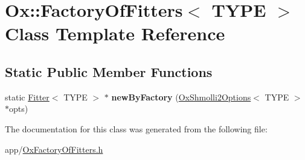 \hypertarget{class_ox_1_1_factory_of_fitters}{\section{Ox\-:\-:Factory\-Of\-Fitters$<$ T\-Y\-P\-E $>$ Class Template Reference}
\label{class_ox_1_1_factory_of_fitters}
}
\subsection*{Static Public Member Functions}
\begin{DoxyCompactItemize}
\item 
\hypertarget{class_ox_1_1_factory_of_fitters_ad6a9b81c02083fca91e2d480cf89aa97}{static \hyperlink{class_ox_1_1_fitter}{Fitter}$<$ T\-Y\-P\-E $>$ $\ast$ {\bfseries new\-By\-Factory} (\hyperlink{struct_ox_1_1_ox_shmolli2_options}{Ox\-Shmolli2\-Options}$<$ T\-Y\-P\-E $>$ $\ast$opts)}\label{class_ox_1_1_factory_of_fitters_ad6a9b81c02083fca91e2d480cf89aa97}

\end{DoxyCompactItemize}


The documentation for this class was generated from the following file\-:\begin{DoxyCompactItemize}
\item 
app/\hyperlink{_ox_factory_of_fitters_8h}{Ox\-Factory\-Of\-Fitters.\-h}\end{DoxyCompactItemize}
